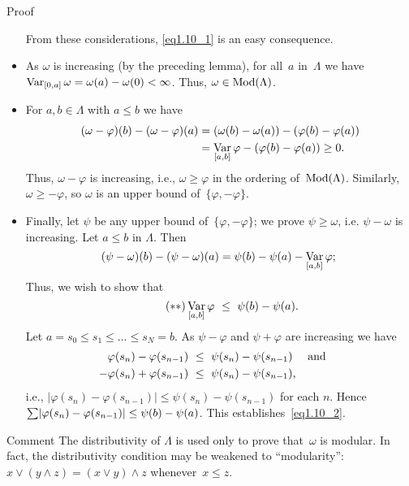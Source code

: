 \documentclass[main.tex]{subfiles}
\begin{document}
\begin{psec*}{Proof}
\begin{itemize}
From these considerations, \eqref{eq1.10_1} is an easy consequence.
%
\item
As $\omega$ is increasing (by the preceding lemma),
for all~$a$ in~$\Lambda$ 
we have $\mathop{\mathrm{Var}}_{[0,a]}\omega = \omega(a)-\omega(0)<\infty$.
Thus, $\omega\in\mathrm{Mod}(\Lambda)$.
%
\item
For $a,b\in\Lambda$ with $a\leq b$ we have
\begin{align*}
(\omega - \varphi)(b) - (\omega-\varphi)(a)
  & = (\omega(b) - \omega(a)) - (\varphi(b) - \varphi(a)) \\
  & = \mathop{\mathrm{Var}}_{[a,b]}\varphi - (\varphi(b) - \varphi(a)) \ge 0
\textnormal{.}
\end{align*}
Thus, $\omega-\varphi$ is increasing, 
i.e., $\omega\ge \varphi$ in the ordering of~$\mathrm{Mod}(\Lambda)$.
Similarly, $\omega\geq -\varphi$,
so $\omega$ is an upper bound of~$\{ \varphi, -\varphi \}$.
%
\item
Finally, 
let $\psi$ be any upper bound of~$\{\varphi,-\varphi\}$;
we prove $\psi\ge \omega$,
i.e. $\psi-\omega$ is increasing.
Let $a\leq b$ in $\Lambda$.
Then 
\begin{equation*}
(\psi-\omega)(b) - (\psi-\omega)(a)
  = \psi(b) - \psi(a) - \mathop{\mathrm{Var}}_{[a,b]}\varphi
\textnormal{; }
\end{equation*}
Thus, 
we wish to show that
\begin{equation}
\label{eq1.10_2}  \tag{$**$}
\mathop{\mathrm{Var}}_{[a,b]}\varphi \ \leq\  \psi(b)-\psi(a) \textnormal{.}
\end{equation}
Let $a=s_0\leq s_1 \leq \ldots \leq s_N = b$.
As $\psi-\varphi$ and $\psi+\varphi$ are increasing we have
\begin{align*}
\varphi(s_n) - \varphi(s_{n-1})
  &\  \leq\  \psi(s_n) - \psi(s_{n-1}) 
\quad\textnormal{ and }\quad \\
-\varphi(s_n) + \varphi(s_{n-1})
  &\  \leq\  \psi(s_n) - \psi(s_{n-1})
\textnormal{,}
\end{align*}
i.e., 
$|\varphi(s_n) - \varphi(s_{n-1})| 
  \leq \psi(s_n) - \psi(s_{n-1})$ 
for each $n$.
Hence~$\smash{\sum} |\varphi(s_n) - \varphi(s_{n-1})|
  \leq \psi (b) - \psi(a)$.
This establishes~\eqref{eq1.10_2}.
\end{itemize}
\end{psec*}
\begin{psec*}{Comment}
The distributivity of $\Lambda$ is used only to prove
that~$\omega$ is modular.  
In fact, 
the distributivity condition 
may be weakened to ``modularity'':
$x\vee(y\wedge z) = (x\vee y)\wedge z$
whenever~$x\leq z$.
\end{psec*}
\end{document}
